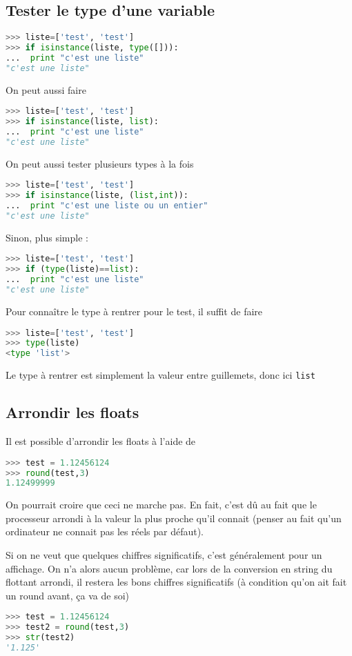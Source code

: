 \documentclass[a4paper,twoside]{article}
\begin{document}
\subsection{Tester le type d'une variable}
\begin{lstlisting}[language=python]
>>> liste=['test', 'test']
>>> if isinstance(liste, type([])):
...  print "c'est une liste"
"c'est une liste"
\end{lstlisting}

On peut aussi faire
\begin{lstlisting}[language=python]
>>> liste=['test', 'test']
>>> if isinstance(liste, list):
...  print "c'est une liste"
"c'est une liste"
\end{lstlisting}

On peut aussi tester plusieurs types à la fois
\begin{lstlisting}[language=python]
>>> liste=['test', 'test']
>>> if isinstance(liste, (list,int)):
...  print "c'est une liste ou un entier"
"c'est une liste"
\end{lstlisting}

Sinon, plus simple :
\begin{lstlisting}[language=python]
>>> liste=['test', 'test']
>>> if (type(liste)==list):
...  print "c'est une liste"
"c'est une liste"
\end{lstlisting}

Pour connaître le type à rentrer pour le test, il suffit de faire
\begin{lstlisting}[language=python]
>>> liste=['test', 'test']
>>> type(liste)
<type 'list'>
\end{lstlisting}
Le type à rentrer est simplement la valeur entre guillemets, donc ici \texttt{list}

\subsection{Arrondir les floats}
Il est possible d'arrondir les floats à l'aide de
\begin{lstlisting}[language=python]
>>> test = 1.12456124
>>> round(test,3)
1.12499999
\end{lstlisting}

On pourrait croire que ceci ne marche pas. En fait, c'est dû au fait que le processeur arrondi à la valeur la plus proche qu'il connait (penser au fait qu'un ordinateur ne connait pas les réels par défaut).

Si on ne veut que quelques chiffres significatifs, c'est généralement pour un affichage. On n'a alors aucun problème, car lors de la conversion en string du flottant arrondi, il restera les bons chiffres significatifs (à condition qu'on ait fait un round avant, ça va de soi)
\begin{lstlisting}[language=python]
>>> test = 1.12456124
>>> test2 = round(test,3)
>>> str(test2)
'1.125'
\end{lstlisting}
\end{document}
